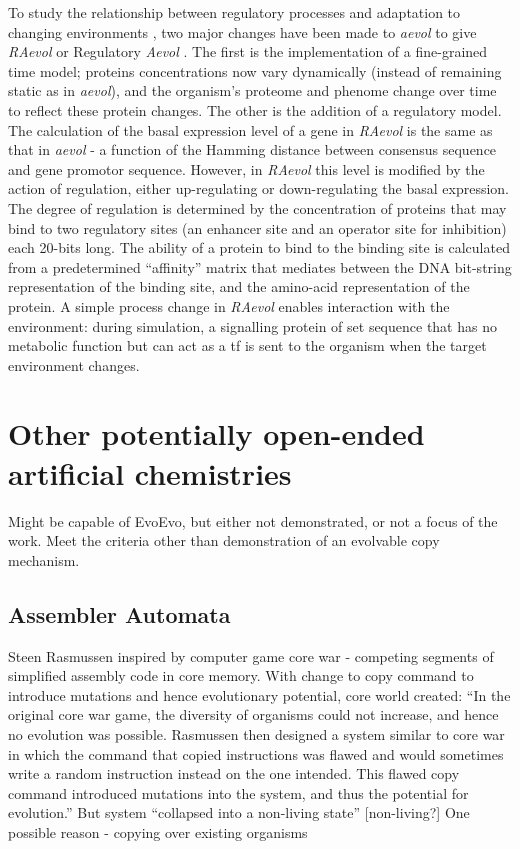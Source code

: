 To study the relationship between regulatory processes and adaptation to changing environments \parencite{Sanchez-Dehesa:2008uq}, two major changes have been made to \emph{aevol} to give \emph{RAevol} or Regulatory \emph{Aevol} \parencite{Beslon:2010zr,Sanchez-Dehesa:2008uq}. The first is the implementation of a fine-grained time model; proteins concentrations now vary dynamically (instead of remaining static as in \emph{aevol}), and the organism's proteome and phenome change over time to reflect these protein changes. The other is the addition of a regulatory model. The calculation of the basal expression level of a gene in \emph{RAevol} is the same as that in \emph{aevol} - a function of the Hamming distance between consensus sequence and gene promotor sequence. However, in \emph{RAevol} this level is modified by the action of regulation, either up-regulating or down-regulating the basal expression. The degree of regulation is determined by the concentration of proteins that may bind to two regulatory sites (an enhancer site and an operator site for inhibition) each 20-bits long. The ability of a protein to bind to the binding site is calculated from a predetermined ``affinity'' matrix that mediates between the DNA bit-string representation of the binding site, and the amino-acid representation of the protein. A simple process change in \emph{RAevol} enables interaction with the environment:  during simulation, a signalling protein of set sequence that has no metabolic function but can act as a \gls{tf} is sent to the organism when the target environment changes.

\section{Other potentially open-ended artificial chemistries}
Might be capable of EvoEvo, but either not demonstrated, or not a focus of the work. Meet the criteria other than demonstration of an evolvable copy mechanism.

\subsection{Assembler Automata}

Steen Rasmussen inspired by computer game core war - competing segments of simplified assembly code in core memory. With change to copy command to introduce mutations and hence evolutionary potential,
core world created: ``In the original core war game, the diversity of organisms could not increase, and hence no evolution was possible. Rasmussen then designed a system similar to core war in which the command that copied instructions was flawed and would sometimes write a random instruction instead on the one intended. This flawed copy command introduced mutations into the system, and thus the potential for evolution.'' \parencite{Ofria2004} 
But system ``collapsed into a non-living state'' {[}non-living?{]} One possible reason - copying over existing organisms \parencite{Ofria2004}

